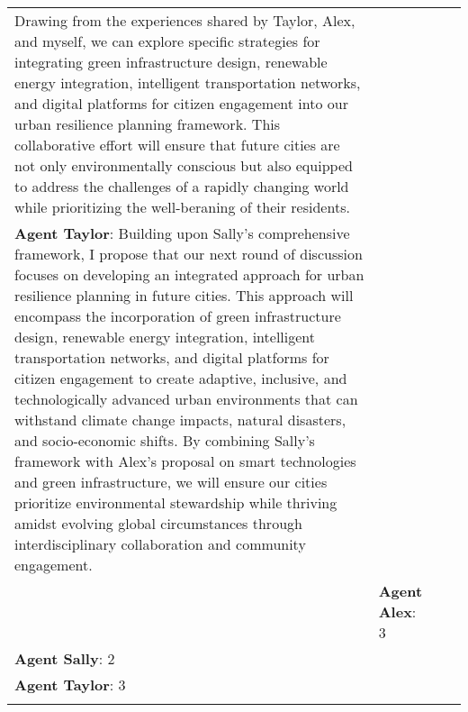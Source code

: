 \documentclass{article}
\begin{document}
\begin{appendix}
\begin{tabular}{| m{2cm} | m{3cm} | m{5cm} | m{5cm} |}
Drawing from the experiences shared by Taylor, Alex, and myself, we can explore specific strategies for integrating green infrastructure design, renewable energy integration, intelligent transportation networks, and digital platforms for citizen engagement into our urban resilience planning framework. This collaborative effort will ensure that future cities are not only environmentally conscious but also equipped to address the challenges of a rapidly changing world while prioritizing the well-beraning of their residents. \\ 
\textbf{Agent Taylor}: Building upon Sally's comprehensive framework, I propose that our next round of discussion focuses on developing an integrated approach for urban resilience planning in future cities. This approach will encompass the incorporation of green infrastructure design, renewable energy integration, intelligent transportation networks, and digital platforms for citizen engagement to create adaptive, inclusive, and technologically advanced urban environments that can withstand climate change impacts, natural disasters, and socio-economic shifts. By combining Sally's framework with Alex's proposal on smart technologies and green infrastructure, we will ensure our cities prioritize environmental stewardship while thriving amidst evolving global circumstances through interdisciplinary collaboration and community engagement. \\ 
 & \textbf{Agent Alex}: 3 \\ 
\textbf{Agent Sally}: 2 \\ 
\textbf{Agent Taylor}: 3 \\ 
 \\
\hline

\end{tabular}
\end{appendix}
\end{document}
